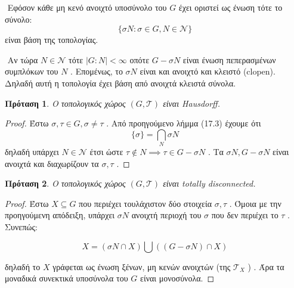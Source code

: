 \documentclass[oneside,a4paper]{article}
\newtheorem{prop}{Πρόταση}
\newcommand {\tl}{\textlatin}
\begin{document}
$ $\newline
\noindent Εφόσον κάθε μη κενό ανοιχτό υποσύνολο του $G$ έχει οριστεί ως ένωση τότε το σύνολο:
$$\{\sigma N : \sigma \in G , N \in \mathcal{N} \}$$
είναι βάση της τοπολογίας.

$ $\newline
\noindent Αν τώρα $N \in \mathcal{N}$ τότε $|G:N|<\infty$ οπότε $G-\sigma N$ είναι ένωση πεπερασμένων συμπλόκων του $N$ . Επομένως, το $\sigma N$ είναι και ανοιχτό και κλειστό (clopen).
Δηλαδή αυτή η τοπολογία έχει βάση από ανοιχτά κλειστά σύνολα.


\begin{prop} Ο τοπολογικός χώρος $(G,\mathcal{T})$ είναι \tl{Hausdorff}.
\end{prop}
\begin{proof}


Έστω $\sigma , \tau \in G, \sigma \neq \tau$ .  Από προηγούμενο λήμμα (17.3) έχουμε ότι 
$$\{\sigma \} = \bigcap_N \sigma N$$
δηλαδή υπάρχει $N \in \mathcal{N}$ έτσι ώστε $\tau \notin N \implies \tau \in G-\sigma N$ . Τα $\sigma N , G-\sigma N$ είναι ανοιχτά και διαχωρίζουν τα $\sigma , \tau$ .
\end{proof} 
\begin{prop} Ο τοπολογικός χώρος $(G, \mathcal{T})$ είναι totally disconnected.
\end{prop}
\begin{proof} Έστω $X\subseteq G$ που περιέχει τουλάχιστον δύο στοιχεία $\sigma ,\tau$ . Όμοια με την προηγούμενη απόδειξη, υπάρχει $\sigma N$ ανοιχτή περιοχή του $\sigma$ που δεν περιέχει το $\tau$ . Συνεπώς:

$$X = \left( \sigma N \cap X \right) \bigcup \left( \left( G-\sigma N\right) \cap X\right)$$

\noindent δηλαδή το $X$ γράφεται ως ένωση ξένων, μη κενών ανοιχτών (της $\mathcal{T}_X$ ) . Άρα τα μοναδικά συνεκτικά υποσύνολα του $G$ είναι μονοσύνολα.
\end{proof}
\end{document}
